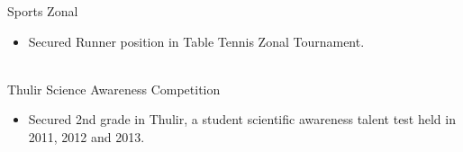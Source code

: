 \documentclass[letterpaper]{Baseclass}
\begin{document}
\begin{envvar} 
	\envvaritem
	{Sports}
	{}
	{\hspace{0.3cm}Zonal}
	{}
	{}
	{
		{\begin{itemize}
				\item Secured Runner position in Table Tennis Zonal Tournament.
		\end{itemize}}
	}
	\\
	\envvaritem
	{Thulir}
	{}
	{\hspace{0.3cm}Science Awareness Competition}
	{}
	{}
	{
		{\begin{itemize}
				\item Secured 2nd grade in Thulir, a student scientific awareness talent test held in 2011, 2012 and 2013.
		\end{itemize}}
	}
	\\

\end{envvar}
\end{document}
